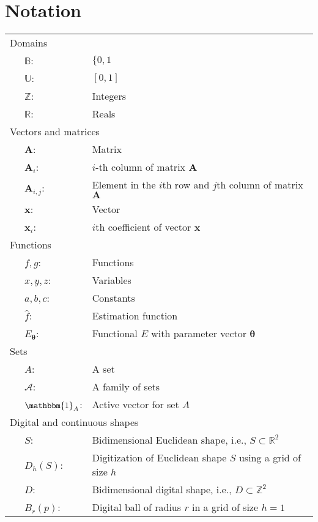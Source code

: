 \chapter{Notation}
\label{chapter:notation}

\begin{tabular}{p{1cm}ll}
\multicolumn{3}{l}{Domains}\\
& $\mathbb{B}$: & $\{0,1$\\\
& $\mathbb{U}$: & $[0,1]$\\
& $\mathbb{Z}$: & Integers\\
& $\mathbb{R}$: & Reals\\[1em]

\multicolumn{3}{l}{Vectors and matrices}\\
& $\mathbf{A}$: & Matrix\\
& $\mathbf{A}_i$: & $i$-th column of matrix $\mathbf{A}$\\
& $\mathbf{A}_{i,j}$: & Element in the $i$th row and $j$th column of matrix $\mathbf{A}$\\
& $\mathbf{x}$: & Vector\\
& $\mathbf{x}_i$: & $i$th coefficient of vector $\mathbf{x}$\\[1em]

\multicolumn{3}{l}{Functions}\\
& $f,g$: & Functions\\
& $x,y,z$: & Variables \\
& $a,b,c$: & Constants \\
& $\hat{f}$: & Estimation function\\
& $E_{\boldsymbol{\theta}}$: & Functional $E$  with parameter vector $\boldsymbol{\theta}$ \\[1em]

\multicolumn{3}{l}{Sets}\\
& $A$: & A set\\
& $\mathcal{A}$: & A family of sets\\
& $\mathbbm{1}_A$: & Active vector for set $A$\\[1em]


\multicolumn{3}{l}{Digital and continuous shapes}\\
& $S$: & Bidimensional Euclidean shape, i.e.,  $S \subset \mathbb{R}^2$\\
& $D_h(S)$: & Digitization of Euclidean shape $S$  using a grid of size $h$\\
& $D$: & Bidimensional digital shape, i.e., $D \subset \mathbb{Z}^2$\\
& $B_r(p)$: & Digital ball of radius $r$  in a grid of size $h=1$ \\[1em]



\end{tabular}
